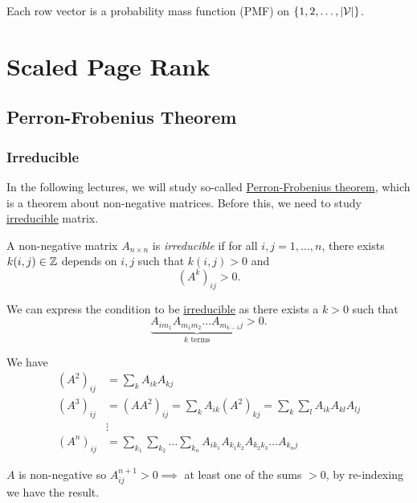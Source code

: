 \begin{remark}
	Each row vector is a probability mass function (PMF) on \(\{1, 2, \ldots , \left\vert \mathcal{\MakeUppercase{v}}  \right\vert \}\).
\end{remark}

\chapter{Scaled Page Rank}
\section{Perron-Frobenius Theorem}
\subsection{Irreducible}
In the following lectures, we will study so-called \hyperref[thm:Perron-Frobenius-theorem]{Perron-Frobenius theorem}, which is a theorem about non-negative matrices.
Before this, we need to study \hyperref[def:irreducible]{irreducible} matrix.

\begin{definition}[Irreducible]\label{def:irreducible}
	A non-negative matrix \(A_{n\times n}\) is \emph{irreducible} if for all \(i, j = 1, \ldots , n\), there exists \(k(i, j)\in \mathbb{\MakeUppercase{z}} \)
	depends on \(i, j\) such that \(k(i, j) > 0\) and
	\[
		(A^k)_{ij}>0.
	\]
\end{definition}

\begin{remark}
	We can express the condition to be \hyperref[def:irreducible]{irreducible} as there exists a \(k > 0\) such that
	\[
		\underbrace{A_{im_1} A_{m_{1}m_2} \ldots A_{m_{k-1}j}}_{k\text{ terms}}>0.
	\]
\end{remark}
\begin{explanation}
	We have
	\[
		\begin{split}
			(A^2)_{ij} &= \sum\limits_{k} A_{ik}A_{kj}\\
			(A^3)_{ij} &= (A A^2)_{ij} = \sum\limits_{k} A_{ik}(A^2)_{kj} = \sum\limits_{k}\sum\limits_{l} A_{ik} A_{kl}A_{lj}\\
			&\vdots\\
			(A^n)_{ij} &= \sum\limits_{k_1}\sum\limits_{k_2}\ldots \sum\limits_{k_n}A_{ik_1}A_{k_1 k_2}A_{k_2 k_3}\ldots A_{k_n j}
		\end{split}
	\]

	\(A\) is non-negative so \(A^{n+1}_{ij} > 0\implies \) at least one of the sums \(>0\), by re-indexing we have the result.
\end{explanation}

